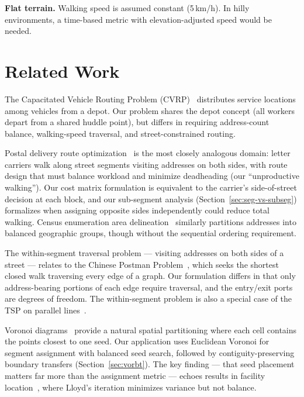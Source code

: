 \documentclass[conference]{IEEEtran}
\begin{document}
\textbf{Flat terrain.} Walking speed is assumed constant (5\,km/h). In hilly environments, a time-based metric with elevation-adjusted speed would be needed.

\section{Related Work}
\label{sec:related}

The Capacitated Vehicle Routing Problem (CVRP)~\cite{toth2014} distributes service locations among vehicles from a depot. Our problem shares the depot concept (all workers depart from a shared huddle point), but differs in requiring address-count balance, walking-speed traversal, and street-constrained routing.

Postal delivery route optimization~\cite{eiselt1995} is the most closely analogous domain: letter carriers walk along street segments visiting addresses on both sides, with route design that must balance workload and minimize deadheading (our ``unproductive walking''). Our cost matrix formulation is equivalent to the carrier's side-of-street decision at each block, and our sub-segment analysis (Section~\ref{sec:seg-vs-subseg}) formalizes when assigning opposite sides independently could reduce total walking. Census enumeration area delineation~\cite{taylor2012} similarly partitions addresses into balanced geographic groups, though without the sequential ordering requirement.

The within-segment traversal problem --- visiting addresses on both sides of a street --- relates to the Chinese Postman Problem~\cite{edmonds1973}, which seeks the shortest closed walk traversing every edge of a graph. Our formulation differs in that only address-bearing portions of each edge require traversal, and the entry/exit ports are degrees of freedom. The within-segment problem is also a special case of the TSP on parallel lines~\cite{frederickson1978}.

Voronoi diagrams~\cite{aurenhammer1991} provide a natural spatial partitioning where each cell contains the points closest to one seed. Our application uses Euclidean Voronoi for segment assignment with balanced seed search, followed by contiguity-preserving boundary transfers (Section~\ref{sec:vorbt}). The key finding --- that seed placement matters far more than the assignment metric --- echoes results in facility location~\cite{lloyd1982}, where Lloyd's iteration minimizes variance but not balance.
\end{document}
